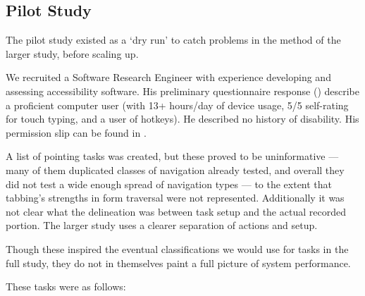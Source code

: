 \documentclass[11pt,openright,a4paper]{report}
\begin{document}
\subsection{Pilot Study}
The pilot study existed as a `dry run' to catch problems in the method of the larger study, before scaling up.

We recruited a Software Research Engineer with experience developing and assessing accessibility software. His preliminary questionnaire response () describe a proficient computer user (with 13+ hours/day of device usage, 5/5 self-rating for touch typing, and a user of hotkeys). He described no history of disability. His permission slip can be found in .

A list of pointing tasks was created, but these proved to be uninformative --- many of them duplicated classes of navigation already tested, and overall they did not test a wide enough spread of navigation types --- to the extent that tabbing's strengths in form traversal were not represented. Additionally it was not clear what the delineation was between task setup and the actual recorded portion. The larger study uses a clearer separation of actions and setup.

Though these inspired the eventual classifications we would use for tasks in the full study, they do not in themselves paint a full picture of system performance.

These tasks were as follows:
\end{document}
